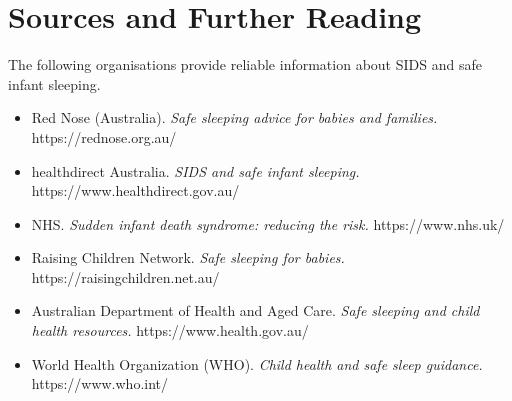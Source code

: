 \section*{Sources and Further Reading}
The following organisations provide reliable information about SIDS and safe infant sleeping.

\begin{itemize}
    \item Red Nose (Australia). \textit{Safe sleeping advice for babies and families.} https://rednose.org.au/
    \item healthdirect Australia. \textit{SIDS and safe infant sleeping.} https://www.healthdirect.gov.au/
    \item NHS. \textit{Sudden infant death syndrome: reducing the risk.} https://www.nhs.uk/
    \item Raising Children Network. \textit{Safe sleeping for babies.} https://raisingchildren.net.au/
    \item Australian Department of Health and Aged Care. \textit{Safe sleeping and child health resources.} https://www.health.gov.au/
    \item World Health Organization (WHO). \textit{Child health and safe sleep guidance.} https://www.who.int/
\end{itemize}

\clearpage
